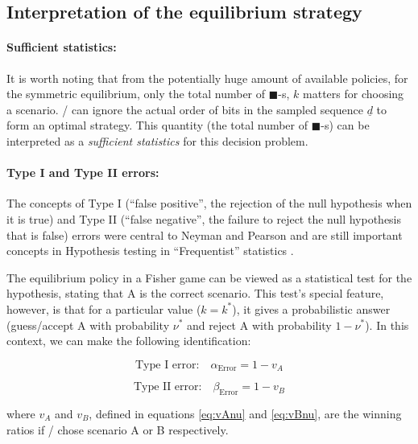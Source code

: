 \documentclass{article}
\newcommand{\bb}{\blacksquare}
\theoremstyle{definition}
\begin{document}
\subsection{Interpretation of the equilibrium strategy}

\paragraph{Sufficient statistics:}

It is worth noting that from the potentially huge amount of available policies, for the symmetric equilibrium, only the total number of $\bb$-s, $k$ matters for choosing a scenario.
\PI/ can ignore the actual order of bits in the sampled sequence $\underline{d}$ to form an optimal strategy. This quantity (the total number of $\bb$-s) can be interpreted as a \emph{sufficient statistics} \cite{book:StatisticalInference,book:Savage} for this decision problem.

\paragraph{Type I and Type II errors:}

The concepts of Type I (``false positive'', the rejection of the null hypothesis when it is true) and Type II (``false negative'', the failure to reject the null hypothesis that is false) errors were central to Neyman and Pearson \cite{paper:NeymanPearson1933b} and are still important concepts in Hypothesis testing in ``Frequentist'' statistics \cite{book:StatisticalInference,book:HandbookParametricNonparametric}.

The equilibrium policy in a Fisher game can be viewed as a statistical test for the hypothesis, stating that A is the correct scenario.
This test's special feature, however, is that for a particular value ($k=k^*$), it gives a probabilistic answer (guess/accept A with probability $\nu^*$ and reject A with probability $1-\nu^*$).
In this context, we can make the following identification:

\begin{equation}
    \text{Type I error:} \quad \alpha_\mathrm{Error} = 1-v_A
\end{equation}

\begin{equation}
    \text{Type II error:} \quad \beta_\mathrm{Error} = 1-v_B
\end{equation}

where $v_A$ and $v_B$, defined in equations \eqref{eq:vAnu} and \eqref{eq:vBnu}, are the winning ratios if \PII/ chose scenario A or B respectively.
\end{document}
